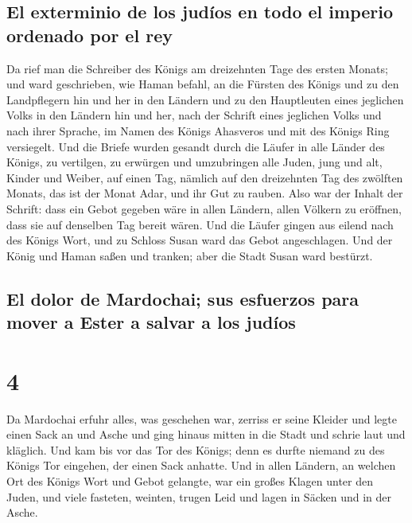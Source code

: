\hypertarget{el-exterminio-de-los-juduxedos-en-todo-el-imperio-ordenado-por-el-rey}{%
\subsection{El exterminio de los judíos en todo el imperio ordenado por
el
rey}\label{el-exterminio-de-los-juduxedos-en-todo-el-imperio-ordenado-por-el-rey}}

 Da rief man die Schreiber des Königs am dreizehnten Tage
des ersten Monats; und ward geschrieben, wie Haman befahl, an die
Fürsten des Königs und zu den Landpflegern hin und her in den Ländern
und zu den Hauptleuten eines jeglichen Volks in den Ländern hin und her,
nach der Schrift eines jeglichen Volks und nach ihrer Sprache, im Namen
des Königs Ahasveros und mit des Königs Ring versiegelt. 
Und die Briefe wurden gesandt durch die Läufer in alle Länder des
Königs, zu vertilgen, zu erwürgen und umzubringen alle Juden, jung und
alt, Kinder und Weiber, auf einen Tag, nämlich auf den dreizehnten Tag
des zwölften Monats, das ist der Monat Adar, und ihr Gut zu rauben.
 Also war der Inhalt der Schrift: dass ein Gebot gegeben
wäre in allen Ländern, allen Völkern zu eröffnen, dass sie auf denselben
Tag bereit wären.  Und die Läufer gingen aus eilend nach
des Königs Wort, und zu Schloss Susan ward das Gebot angeschlagen. Und
der König und Haman saßen und tranken; aber die Stadt Susan ward
bestürzt.

\hypertarget{el-dolor-de-mardochai-sus-esfuerzos-para-mover-a-ester-a-salvar-a-los-juduxedos}{%
\subsection{El dolor de Mardochai; sus esfuerzos para mover a Ester a
salvar a los
judíos}\label{el-dolor-de-mardochai-sus-esfuerzos-para-mover-a-ester-a-salvar-a-los-juduxedos}}

\hypertarget{section-3}{%
\section{4}\label{section-3}}

 Da Mardochai erfuhr alles, was geschehen war, zerriss er
seine Kleider und legte einen Sack an und Asche und ging hinaus mitten
in die Stadt und schrie laut und kläglich.  Und kam bis
vor das Tor des Königs; denn es durfte niemand zu des Königs Tor
eingehen, der einen Sack anhatte.  Und in allen Ländern,
an welchen Ort des Königs Wort und Gebot gelangte, war ein großes Klagen
unter den Juden, und viele fasteten, weinten, trugen Leid und lagen in
Säcken und in der Asche.

